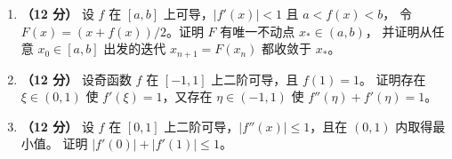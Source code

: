 \documentclass[UTF8,a4paper,zihao=-4,fontset=fandol]{ctexart}
\begin{document}
\begin{enumerate}[start=20]
\item \textbf{（12 分）} 设 $f$ 在 $[a,b]$ 上可导，$|f'(x)|<1$ 且 $a<f(x)<b$，
令 $F(x)=(x+f(x))/2$。证明 $F$ 有唯一不动点 $x_*\in(a,b)$，
并证明从任意 $x_0\in[a,b]$ 出发的迭代 $x_{n+1}=F(x_n)$ 都收敛于 $x_*$。
\vspace{5.5cm}
\item \textbf{（12 分）} 设奇函数 $f$ 在 $[-1,1]$ 上二阶可导，且 $f(1)=1$。
证明存在 $\xi\in(0,1)$ 使 $f'(\xi)=1$，又存在 $\eta\in(-1,1)$ 使 $f''(\eta)+f'(\eta)=1$。
\vspace{5.5cm}
\item \textbf{（12 分）} 设 $f$ 在 $[0,1]$ 上二阶可导，$|f''(x)|\le1$，且在 $(0,1)$ 内取得最小值。
证明 $|f'(0)|+|f'(1)|\le1$。
\end{enumerate}
\end{document}
